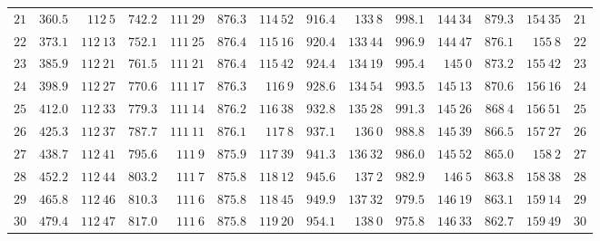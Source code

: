 \begin{GaussVICeresFrame}{.92}
{\begin{tabular}{r@{\GaussVICeresRule}r|r@{\GaussVICeresRule}r|r@{\GaussVICeresRule}r|r@{\GaussVICeresRule}r|r@{\GaussVICeresRule}r|r@{\GaussVICeresRule}r|r@{\GaussVICeresRule}r}
$21$ & $360.5$ & $112\ 5$ & $742.2$ & $111\ 29$ & $876.3$ & $114\ 52$ & $916.4$ & $133\ 8$ & $998.1$ & $144\ 34$ & $879.3$ & $154\ 35$ & $21$ \\
$22$ & $373.1$ & $112\ 13$ & $752.1$ & $111\ 25$ & $876.4$ & $115\ 16$ & $920.4$ & $133\ 44$ & $996.9$ & $144\ 47$ & $876.1$ & $155\ 8$ & $22$ \\
$23$ & $385.9$ & $112\ 21$ & $761.5$ & $111\ 21$ & $876.4$ & $115\ 42$ & $924.4$ & $134\ 19$ & $995.4$ & $145\ 0$ & $873.2$ & $155\ 42$ & $23$ \\
$24$ & $398.9$ & $112\ 27$ & $770.6$ & $111\ 17$ & $876.3$ & $116\ 9$ & $928.6$ & $134\ 54$ & $993.5$ & $145\ 13$ & $870.6$ & $156\ 16$ & $24$ \\
$25$ & $412.0$ & $112\ 33$ & $779.3$ & $111\ 14$ & $876.2$ & $116\ 38$ & $932.8$ & $135\ 28$ & $991.3$ & $145\ 26$ & $868\ 4$ & $156\ 51$ & $25$ \\[3pt]
$26$ & $425.3$ & $112\ 37$ & $787.7$ & $111\ 11$ & $876.1$ & $117\ 8$ & $937.1$ & $136\ 0$ & $988.8$ & $145\ 39$ & $866.5$ & $157\ 27$ & $26$ \\
$27$ & $438.7$ & $112\ 41$ & $795.6$ & $111\ 9$ & $875.9$ & $117\ 39$ & $941.3$ & $136\ 32$ & $986.0$ & $145\ 52$ & $865.0$ & $158\ 2$ & $27$ \\
$28$ & $452.2$ & $112\ 44$ & $803.2$ & $111\ 7$ & $875.8$ & $118\ 12$ & $945.6$ & $137\ 2$ & $982.9$ & $146\ 5$ & $863.8$ & $158\ 38$ & $28$ \\
$29$ & $465.8$ & $112\ 46$ & $810.3$ & $111\ 6$ & $875.8$ & $118\ 45$ & $949.9$ & $137\ 32$ & $979.5$ & $146\ 19$ & $863.1$ & $159\ 14$ & $29$ \\
$30$ & $479.4$ & $112\ 47$ & $817.0$ & $111\ 6$ & $875.8$ & $119\ 20$ & $954.1$ & $138\ 0$ & $975.8$ & $146\ 33$ & $862.7$ & $159\ 49$ & $30$ \\
\end{tabular}\par}
\end{GaussVICeresFrame}

